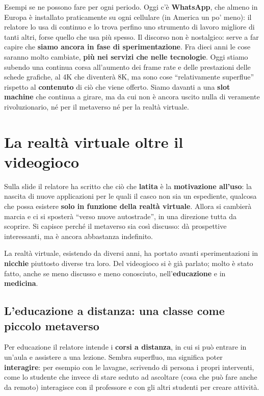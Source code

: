 Esempi se ne possono fare per ogni periodo. Oggi c'è \textbf{WhatsApp}, che
almeno in Europa è installato praticamente su ogni cellulare (in America un po'
meno): il relatore lo usa di continuo e lo trova perfino uno strumento di lavoro
migliore di tanti altri, forse quello che usa più spesso. Il discorso non è
nostalgico: serve a far capire che \textbf{siamo ancora in fase di
sperimentazione}. Fra dieci anni le cose saranno molto cambiate, \textbf{più nei
servizi che nelle tecnologie}. Oggi stiamo subendo una continua corsa
all'aumento dei frame rate e delle prestazioni delle schede grafiche, al 4K che
diventerà 8K, ma sono cose ``relativamente superflue'' rispetto al
\textbf{contenuto} di ciò che viene offerto. Siamo davanti a una \textbf{slot
machine} che continua a girare, ma da cui non è ancora uscito nulla di
veramente rivoluzionario, né per il metaverso né per la realtà virtuale.

\section{La realtà virtuale oltre il videogioco}
\label{z8:sec:vr-nicchie}

Sulla slide il relatore ha scritto che ciò che \textbf{latita} è la
\textbf{motivazione all'uso}: la nascita di nuove applicazioni per le quali il
casco non sia un espediente, qualcosa che possa esistere \textbf{solo in
funzione della realtà virtuale}. Allora si cambierà marcia e ci si sposterà
``verso nuove autostrade'', in una direzione tutta da scoprire. Si capisce perché
il metaverso sia così discusso: dà prospettive interessanti, ma è ancora
abbastanza indefinito.

La realtà virtuale, esistendo da diversi anni, ha portato avanti
sperimentazioni in \textbf{nicchie} piuttosto diverse tra loro. Del videogioco si
è già parlato; molto è stato fatto, anche se meno discusso e meno conosciuto,
nell'\textbf{educazione} e in \textbf{medicina}.

\subsection{L'educazione a distanza: una classe come piccolo metaverso}

Per educazione il relatore intende i \textbf{corsi a distanza}, in cui si può
entrare in un'aula e assistere a una lezione. Sembra superfluo, ma significa
poter \textbf{interagire}: per esempio con le lavagne, scrivendo di persona i
propri interventi, come lo studente che invece di stare seduto ad ascoltare
(cosa che può fare anche da remoto) interagisce con il professore e con gli
altri studenti per creare attività.

